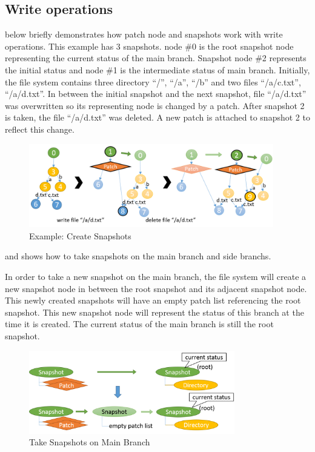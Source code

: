 \subsection{Write operations}

	 below briefly demonstrates how patch node and snapshots work with write operations. This example has 3 snapshots. node \#0 is the root snapshot node representing the current status of the main branch. Snapshot node \#2 represents the initial status and node \#1 is the intermediate status of main branch. Initially, the file system contains three directory ``/'', ``/a'', ``/b'' and two files ``/a/c.txt'', ``/a/d.txt''. In between the initial snapshot and the next snapshot, file ``/a/d.txt'' was overwritten so its representing node is changed by a patch. After snapshot 2 is taken, the file ``/a/d.txt'' was deleted. A new patch is attached to snapshot 2 to reflect this change.

\begin{figure}[hbtp]
\centering
\includegraphics[width=0.95\textwidth]{Chapter-4/figs/fig26.png}
\caption{Example: Create Snapshots}
\label{fig:create_snapshots}
\end{figure}

     and  shows how to take snapshots on the main branch and side branchs.

    In order to take a new snapshot on the main branch, the file system will create a new snapshot node in between the root snapshot and its adjacent snapshot node. This newly created snapshots will have an empty patch list referencing the root snapshot. This new snapshot node will represent the status of this branch at the time it is created. The current status of the main branch is still the root snapshot.

\begin{figure}[hbtp]
\centering
\includegraphics[width=0.8\textwidth]{Chapter-4/figs/fig20.png}
\caption{Take Snapshots on Main Branch}
\label{fig:take_snapshot_root}
\end{figure}
    
